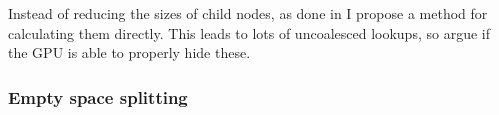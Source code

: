 \begin{algorithm}
\begin{algorithmic}
{                 \STATE{}

                   \ELSE
                   \ENDIF
                 \ENDFOR
  }
  \end{algorithmic}
\end{algorithm}



Instead of reducing the sizes of child nodes, as done in \zhou{} I
propose a method for calculating them directly. This leads to lots
of uncoalesced lookups, so argue if the GPU is able to properly hide
these.








\subsubsection{Empty space splitting}\label{sec:gpuEmptySpace}



